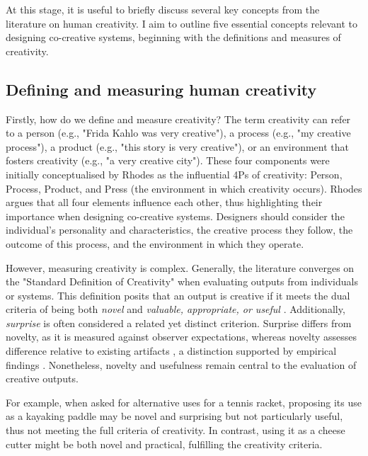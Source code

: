 
\cite{Enhancing human creativity}

At this stage, it is useful to briefly discuss several key concepts from the literature on human creativity. I aim to outline five essential concepts relevant to designing co-creative systems, beginning with the definitions and measures of creativity.

\subsection{Defining and measuring human creativity}

Firstly, how do we define and measure creativity? The term creativity can refer to a person (e.g., "Frida Kahlo was very creative"), a process (e.g., "my creative process"), a product (e.g., "this story is very creative"), or an environment that fosters creativity (e.g., "a very creative city"). These four components were initially conceptualised by Rhodes \cite{Rhodes1961-od} as the influential 4Ps of creativity: Person, Process, Product, and Press (the environment in which creativity occurs). Rhodes argues that all four elements influence each other, thus highlighting their importance when designing co-creative systems. Designers should consider the individual’s personality and characteristics, the creative process they follow, the outcome of this process, and the environment in which they operate.

However, measuring creativity is complex. Generally, the literature converges on the "Standard Definition of Creativity" when evaluating outputs from individuals or systems. This definition posits that an output is creative if it meets the dual criteria of being both \textit{novel} and \textit{valuable, appropriate, or useful} \cite{Amabile1983-lj, Sternberg1998-oz, Runco2012-mk, Boden2003-hk}. Additionally, \textit{surprise} is often considered a related yet distinct criterion. Surprise differs from novelty, as it is measured against observer expectations, whereas novelty assesses difference relative to existing artifacts \cite{Simonton2012-bv}, a distinction supported by empirical findings \cite{Grace2015-uc}. Nonetheless, novelty and usefulness remain central to the evaluation of creative outputs.

For example, when asked for alternative uses for a tennis racket, proposing its use as a kayaking paddle may be novel and surprising but not particularly useful, thus not meeting the full criteria of creativity. In contrast, using it as a cheese cutter might be both novel and practical, fulfilling the creativity criteria.

